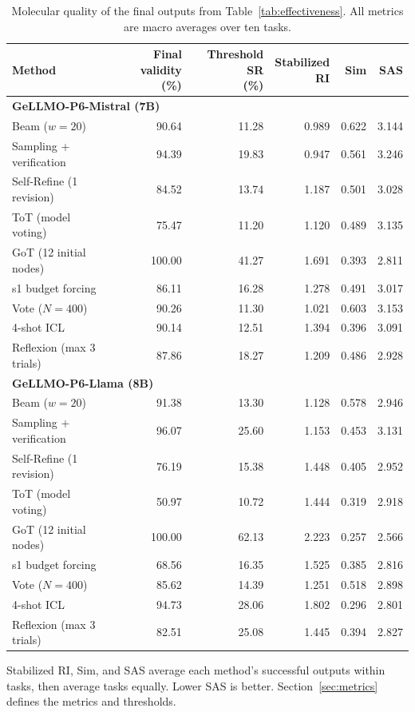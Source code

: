 \begin{table}[t]
\centering\EvalTableFont
\setlength{\tabcolsep}{4pt}\renewcommand{\arraystretch}{1.10}
\caption{Molecular quality of the final outputs from Table~\ref{tab:effectiveness}. All metrics are macro averages over ten tasks.}
\label{tab:quality}
\begin{tabular*}{\linewidth}{@{\extracolsep{\fill}}l r r r r r@{}}
\toprule
Method & \shortstack{Final validity\\(\%)} & \shortstack{Threshold SR\\(\%)} & \shortstack{Stabilized\\RI} & Sim & SAS \\
\midrule
\multicolumn{6}{l}{\textbf{GeLLMO-P6-Mistral (7B)}} \\
Beam ($w=20$) & 90.64 & 11.28 & 0.989 & 0.622 & 3.144 \\
Sampling + verification & 94.39 & 19.83 & 0.947 & 0.561 & 3.246 \\
Self-Refine (1 revision) & 84.52 & 13.74 & 1.187 & 0.501 & 3.028 \\
ToT (model voting) & 75.47 & 11.20 & 1.120 & 0.489 & 3.135 \\
GoT (12 initial nodes) & 100.00 & 41.27 & 1.691 & 0.393 & 2.811 \\
s1 budget forcing & 86.11 & 16.28 & 1.278 & 0.491 & 3.017 \\
Vote ($N=400$) & 90.26 & 11.30 & 1.021 & 0.603 & 3.153 \\
4-shot ICL & 90.14 & 12.51 & 1.394 & 0.396 & 3.091 \\
Reflexion (max 3 trials) & 87.86 & 18.27 & 1.209 & 0.486 & 2.928 \\
\midrule
\multicolumn{6}{l}{\textbf{GeLLMO-P6-Llama (8B)}} \\
Beam ($w=20$) & 91.38 & 13.30 & 1.128 & 0.578 & 2.946 \\
Sampling + verification & 96.07 & 25.60 & 1.153 & 0.453 & 3.131 \\
Self-Refine (1 revision) & 76.19 & 15.38 & 1.448 & 0.405 & 2.952 \\
ToT (model voting) & 50.97 & 10.72 & 1.444 & 0.319 & 2.918 \\
GoT (12 initial nodes) & 100.00 & 62.13 & 2.223 & 0.257 & 2.566 \\
s1 budget forcing & 68.56 & 16.35 & 1.525 & 0.385 & 2.816 \\
Vote ($N=400$) & 85.62 & 14.39 & 1.251 & 0.518 & 2.898 \\
4-shot ICL & 94.73 & 28.06 & 1.802 & 0.296 & 2.801 \\
Reflexion (max 3 trials) & 82.51 & 25.08 & 1.445 & 0.394 & 2.827 \\
\bottomrule\end{tabular*}
\par\vspace{5pt}\noindent\begin{minipage}{\linewidth}\TableNoteFont
Stabilized RI, Sim, and SAS average each method's successful outputs within tasks, then average tasks equally. Lower SAS is better. Section~\ref{sec:metrics} defines the metrics and thresholds.
\end{minipage}
\end{table}
